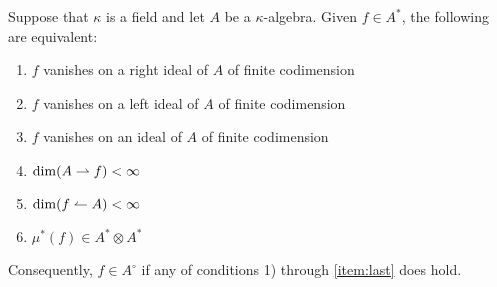 \begin{thm}
    Suppose that\/ $\kappa$ is a field and let\/ $A$ be a\/ $\kappa$-algebra. Given\/ $f\in A^*$, the following are equivalent:
    \begin{enumerate}[\rm 1)]
        \item $f$ vanishes on a right ideal of\/ $A$ of finite codimension
        \item $f$ vanishes on a left ideal of\/ $A$ of finite codimension
        \item $f$ vanishes on an ideal of\/ $A$ of finite codimension
        \item $\dim(A\rightharpoonup f)<\infty$
        \item $\dim(f\leftharpoonup A)<\infty$
        \item\label{item:last} $\mu^*(f)\in A^*\otimes A^*$
    \end{enumerate}
    Consequently, $f \in A^{\circ}$ if any of conditions\/ {\rm 1)} through {\rm\ref{item:last}} does hold.
\end{thm}


